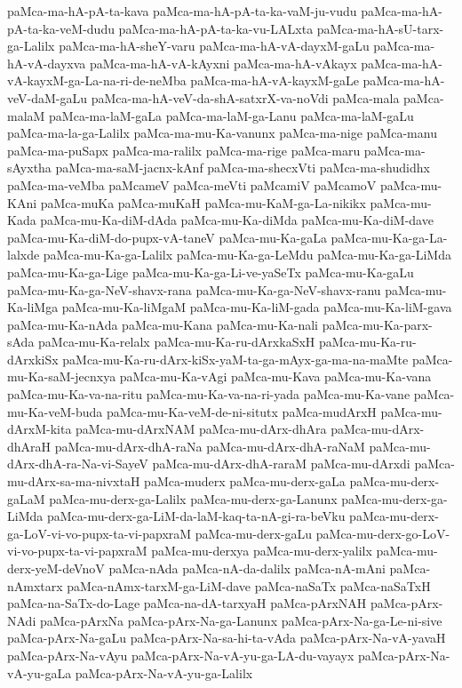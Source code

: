{paMca-ma-hA-pA-ta-kava
paMca-ma-hA-pA-ta-ka-vaM-ju-vudu
paMca-ma-hA-pA-ta-ka-veM-dudu
paMca-ma-hA-pA-ta-ka-vu-LALxta
paMca-ma-hA-sU-tarx-ga-Lalilx
paMca-ma-hA-sheY-varu
paMca-ma-hA-vA-dayxM-gaLu
paMca-ma-hA-vA-dayxva
paMca-ma-hA-vA-kAyxni
paMca-ma-hA-vAkayx
paMca-ma-hA-vA-kayxM-ga-La-na-ri-de-neMba
paMca-ma-hA-vA-kayxM-gaLe
paMca-ma-hA-veV-daM-gaLu
paMca-ma-hA-veV-da-shA-satxrX-va-noVdi
paMca-mala
paMca-malaM
paMca-ma-laM-gaLa
paMca-ma-laM-ga-Lanu
paMca-ma-laM-gaLu
paMca-ma-la-ga-Lalilx
paMca-ma-mu-Ka-vanunx
paMca-ma-nige
paMca-manu
paMca-ma-puSapx
paMca-ma-ralilx
paMca-ma-rige
paMca-maru
paMca-ma-sAyxtha
paMca-ma-saM-jacnx-kAnf
paMca-ma-shecxVti
paMca-ma-shudidhx
paMca-ma-veMba
paMcameV
paMca-meVti
paMcamiV
paMcamoV
paMca-mu-KAni
paMca-muKa
paMca-muKaH
paMca-mu-KaM-ga-La-nikikx
paMca-mu-Kada
paMca-mu-Ka-diM-dAda
paMca-mu-Ka-diMda
paMca-mu-Ka-diM-dave
paMca-mu-Ka-diM-do-pupx-vA-taneV
paMca-mu-Ka-gaLa
paMca-mu-Ka-ga-La-lalxde
paMca-mu-Ka-ga-Lalilx
paMca-mu-Ka-ga-LeMdu
paMca-mu-Ka-ga-LiMda
paMca-mu-Ka-ga-Lige
paMca-mu-Ka-ga-Li-ve-yaSeTx
paMca-mu-Ka-gaLu
paMca-mu-Ka-ga-NeV-shavx-rana
paMca-mu-Ka-ga-NeV-shavx-ranu
paMca-mu-Ka-liMga
paMca-mu-Ka-liMgaM
paMca-mu-Ka-liM-gada
paMca-mu-Ka-liM-gava
paMca-mu-Ka-nAda
paMca-mu-Kana
paMca-mu-Ka-nali
paMca-mu-Ka-parx-sAda
paMca-mu-Ka-relalx
paMca-mu-Ka-ru-dArxkaSxH
paMca-mu-Ka-ru-dArxkiSx
paMca-mu-Ka-ru-dArx-kiSx-yaM-ta-ga-mAyx-ga-ma-na-maMte
paMca-mu-Ka-saM-jecnxya
paMca-mu-Ka-vAgi
paMca-mu-Kava
paMca-mu-Ka-vana
paMca-mu-Ka-va-na-ritu
paMca-mu-Ka-va-na-ri-yada
paMca-mu-Ka-vane
paMca-mu-Ka-veM-buda
paMca-mu-Ka-veM-de-ni-situtx
paMca-mudArxH
paMca-mu-dArxM-kita
paMca-mu-dArxNAM
paMca-mu-dArx-dhAra
paMca-mu-dArx-dhAraH
paMca-mu-dArx-dhA-raNa
paMca-mu-dArx-dhA-raNaM
paMca-mu-dArx-dhA-ra-Na-vi-SayeV
paMca-mu-dArx-dhA-raraM
paMca-mu-dArxdi
paMca-mu-dArx-sa-ma-nivxtaH
paMca-muderx
paMca-mu-derx-gaLa
paMca-mu-derx-gaLaM
paMca-mu-derx-ga-Lalilx
paMca-mu-derx-ga-Lanunx
paMca-mu-derx-ga-LiMda
paMca-mu-derx-ga-LiM-da-laM-kaq-ta-nA-gi-ra-beVku
paMca-mu-derx-ga-LoV-vi-vo-pupx-ta-vi-papxraM
paMca-mu-derx-gaLu
paMca-mu-derx-go-LoV-vi-vo-pupx-ta-vi-papxraM
paMca-mu-derxya
paMca-mu-derx-yalilx
paMca-mu-derx-yeM-deVnoV
paMca-nAda
paMca-nA-da-dalilx
paMca-nA-mAni
paMca-nAmxtarx
paMca-nAmx-tarxM-ga-LiM-dave
paMca-naSaTx
paMca-naSaTxH
paMca-na-SaTx-do-Lage
paMca-na-dA-tarxyaH
paMca-pArxNAH
paMca-pArx-NAdi
paMca-pArxNa
paMca-pArx-Na-ga-Lanunx
paMca-pArx-Na-ga-Le-ni-sive
paMca-pArx-Na-gaLu
paMca-pArx-Na-sa-hi-ta-vAda
paMca-pArx-Na-vA-yavaH
paMca-pArx-Na-vAyu
paMca-pArx-Na-vA-yu-ga-LA-du-vayayx
paMca-pArx-Na-vA-yu-gaLa
paMca-pArx-Na-vA-yu-ga-Lalilx
}
